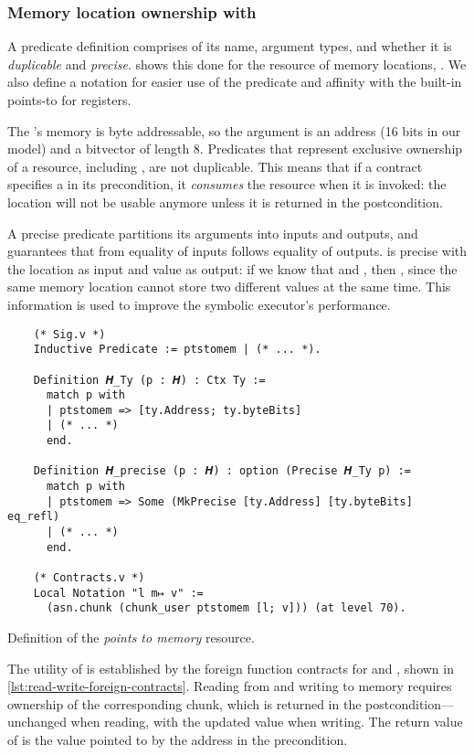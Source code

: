 \subsubsection{Memory location ownership with }

A predicate definition comprises of its name, argument types, and whether it is \emph{duplicable} and \emph{precise}.  shows this done for the resource of memory locations, . We also define a notation  for easier use of the predicate and affinity with the built-in points-to for registers.

The \msp's memory is byte addressable, so the argument  is an address (16 bits in our model) and  a bitvector of length 8. Predicates that represent exclusive ownership of a resource, including , are not duplicable. This means that if a contract specifies a  in its precondition, it \emph{consumes} the resource when it is invoked: the location will not be usable anymore unless it is returned in the postcondition.

A precise predicate partitions its arguments into inputs and outputs, and guarantees that from equality of inputs follows equality of outputs.  is precise with the location as input and value as output: if we know that  and , then , since the same memory location cannot store two different values at the same time. This information is used to improve the symbolic executor's performance.

\begin{listing}
  \begin{verbatim}
    (* Sig.v *)
    Inductive Predicate := ptstomem | (* ... *).

    Definition 𝑯_Ty (p : 𝑯) : Ctx Ty :=
      match p with
      | ptstomem => [ty.Address; ty.byteBits]
      | (* ... *)
      end.

    Definition 𝑯_precise (p : 𝑯) : option (Precise 𝑯_Ty p) :=
      match p with
      | ptstomem => Some (MkPrecise [ty.Address] [ty.byteBits] eq_refl)
      | (* ... *)
      end.

    (* Contracts.v *)
    Local Notation "l m↦ v" :=
      (asn.chunk (chunk_user ptstomem [l; v])) (at level 70).
  \end{verbatim}
  \caption{Definition of the \emph{points to memory} resource.}
  \label{lst:ptstomem}
\end{listing}

The utility of  is established by the foreign function contracts for  and , shown in \cref{lst:read-write-foreign-contracts}. Reading from and writing to memory requires ownership of the corresponding  chunk, which is returned in the postcondition---unchanged when reading, with the updated value when writing. The return value of  is the value pointed to by the address in the precondition.

